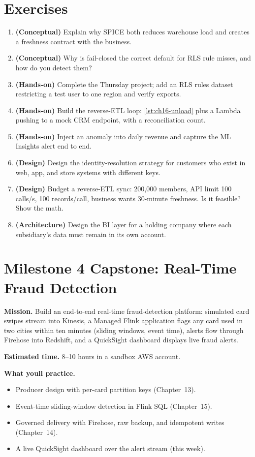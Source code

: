 \section{Exercises}
\begin{enumerate}
    \item \textbf{(Conceptual)} Explain why SPICE both reduces warehouse load and creates a freshness contract with the business.
    \item \textbf{(Conceptual)} Why is fail-closed the correct default for RLS rule misses, and how do you detect them?
    \item \textbf{(Hands-on)} Complete the Thursday project; add an RLS rules dataset restricting a test user to one region and verify exports.
    \item \textbf{(Hands-on)} Build the reverse-ETL loop: \cref{lst:ch16-unload} plus a Lambda pushing to a mock CRM endpoint, with a reconciliation count.
    \item \textbf{(Hands-on)} Inject an anomaly into daily revenue and capture the ML Insights alert end to end.
    \item \textbf{(Design)} Design the identity-resolution strategy for customers who exist in web, app, and store systems with different keys.
    \item \textbf{(Design)} Budget a reverse-ETL sync: 200{,}000 members, API limit 100 calls/s, 100 records/call, business wants 30-minute freshness. Is it feasible? Show the math.
    \item \textbf{(Architecture)} Design the BI layer for a holding company where each subsidiary's data must remain in its own account.
\end{enumerate}

\section{Milestone 4 Capstone: Real-Time Fraud Detection}\label{sec:ch16-capstone}

\begin{capstonebox}
\textbf{Mission.} Build an end-to-end real-time fraud-detection platform: simulated card swipes stream into Kinesis, a Managed Flink application flags any card used in two cities within ten minutes (sliding windows, event time), alerts flow through Firehose into Redshift, and a QuickSight dashboard displays live fraud alerts.

\textbf{Estimated time.} 8--10 hours in a sandbox AWS account.

\textbf{What you\textquotesingle{}ll practice.}
\begin{itemize}
    \item Producer design with per-card partition keys (Chapter~13).
    \item Event-time sliding-window detection in Flink SQL (Chapter~15).
    \item Governed delivery with Firehose, raw backup, and idempotent writes (Chapter~14).
    \item A live QuickSight dashboard over the alert stream (this week).
\end{itemize}
\end{capstonebox}

